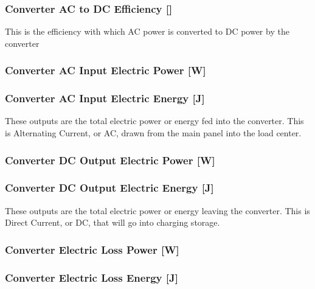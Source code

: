 \subsubsection{\texorpdfstring{Converter AC to DC Efficiency {[]}}{Converter AC to DC Efficiency }}\label{converter-ac-to-dc-efficiency}

This is the efficiency with which AC power is converted to DC power by the converter

\subsubsection{Converter AC Input Electric Power {[}W{]}}\label{converter-ac-input-electric-power-w}

\subsubsection{Converter AC Input Electric Energy {[}J{]}}\label{converter-ac-input-electric-energy-j}

These outputs are the total electric power or energy fed into the converter. This is Alternating Current, or AC, drawn from the main panel into the load center.

\subsubsection{Converter DC Output Electric Power {[}W{]}}\label{converter-dc-output-electric-power-w}

\subsubsection{Converter DC Output Electric Energy {[}J{]}}\label{converter-dc-output-electric-energy-j}

These outputs are the total electric power or energy leaving the converter. This is Direct Current, or DC, that will go into charging storage.

\subsubsection{Converter Electric Loss Power {[}W{]}}\label{converter-electric-loss-power-w}

\subsubsection{Converter Electric Loss Energy {[}J{]}}\label{converter-electric-loss-energy-j}

